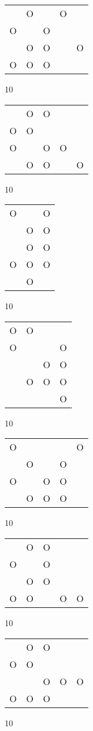 \begin{tabular}{|m{0.2cm}m{0.2cm}m{0.2cm}m{0.2cm}m{0.2cm}|}\hline
 &O& &O& \\
O& &O& & \\
 &O&O& &O\\
O&O&O& & \\
\hline\end{tabular}10
\begin{tabular}{|m{0.2cm}m{0.2cm}m{0.2cm}m{0.2cm}m{0.2cm}|}\hline
 &O&O& & \\
O&O& & & \\
O& &O&O& \\
 &O&O& &O\\
\hline\end{tabular}10
\begin{tabular}{|m{0.2cm}m{0.2cm}m{0.2cm}|}\hline
O& &O\\
 &O&O\\
 &O&O\\
O&O&O\\
 &O& \\
\hline\end{tabular}10
\begin{tabular}{|m{0.2cm}m{0.2cm}m{0.2cm}m{0.2cm}|}\hline
O&O& & \\
O& & &O\\
 & &O&O\\
 &O&O&O\\
 & & &O\\
\hline\end{tabular}10
\begin{tabular}{|m{0.2cm}m{0.2cm}m{0.2cm}m{0.2cm}m{0.2cm}|}\hline
O& & & &O\\
 &O& &O& \\
O& &O&O& \\
 &O&O&O& \\
\hline\end{tabular}10
\begin{tabular}{|m{0.2cm}m{0.2cm}m{0.2cm}m{0.2cm}m{0.2cm}|}\hline
 &O&O& & \\
O& &O& & \\
 &O&O& & \\
O&O& &O&O\\
\hline\end{tabular}10
\begin{tabular}{|m{0.2cm}m{0.2cm}m{0.2cm}m{0.2cm}m{0.2cm}|}\hline
 &O&O& & \\
O&O& & & \\
 & &O&O&O\\
O&O&O& & \\
\hline\end{tabular}10
